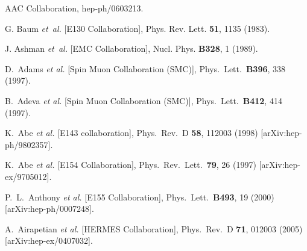 \documentclass[12pt]{article}
\begin{document}
\begin{thebibliography}{99}

AAC Collaboration, hep-ph/0603213.

G. Baum {\it et~al.} [E130 Collaboration],
Phys. Rev. Lett. {\bf 51}, 1135 (1983).

J. Ashman {\it et~al.} [EMC Collaboration],
Nucl. Phys. {\bf B328}, 1 (1989).

  D.~Adams {\it et al.}  [Spin Muon Collaboration (SMC)],
  Phys.\ Lett.\  {\bf B396}, 338 (1997).

  B.~Adeva {\it et al.}  [Spin Muon Collaboration (SMC)],
  Phys.\ Lett.\  {\bf B412}, 414 (1997).

  K.~Abe {\it et al.}  [E143 collaboration],
  Phys.\ Rev.\ D {\bf 58}, 112003 (1998)
  [arXiv:hep-ph/9802357].

  K.~Abe {\it et al.}  [E154 Collaboration],
  Phys.\ Rev.\ Lett.\  {\bf 79}, 26 (1997)
  [arXiv:hep-ex/9705012].

  P.~L.~Anthony {\it et al.}  [E155 Collaboration],
  Phys.\ Lett.\  {\bf B493}, 19 (2000)
  [arXiv:hep-ph/0007248].
  
  A.~Airapetian {\it et al.}  [HERMES Collaboration],
  Phys.\ Rev.\ D {\bf 71}, 012003 (2005)
  [arXiv:hep-ex/0407032].


\end{thebibliography}
\end{document}
